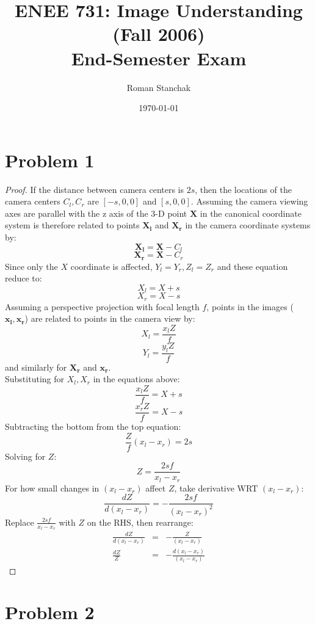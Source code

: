 \documentclass[letter,11pt]{article}
\title{ENEE 731: Image Understanding (Fall 2006)\\
End-Semester Exam}
\author{Roman Stanchak}
\date{\today}
\begin{document}
\maketitle

\section*{Problem 1}

	{\begin{proof} If the distance between camera centers is $2s$, then the locations of the camera centers $C_l,C_r$ are $[-s, 0, 0]$ and $[s, 0, 0]$.  Assuming the camera viewing axes are parallel with the z axis of the 3-D point $\mathbf{X}$ in the canonical coordinate system is therefore related to points $\mathbf{X_l}$ and $\mathbf{X_r}$ in the camera coordinate systems by:
$$\mathbf{X_l}=\mathbf{X}-C_l$$
$$\mathbf{X_r}=\mathbf{X}-C_r$$
Since only the $X$ coordinate is affected, $Y_l=Y_r, Z_l=Z_r$ and these equation reduce to:
$$X_l=X+s$$
$$X_r=X-s$$
Assuming a perspective projection with focal length $f$, points in the images ($\mathbf{x_l},\mathbf{x_r}$) are related to points in the camera view by:
$$X_l = \frac{x_l Z}{f}$$
$$Y_l = \frac{y_l Z}{f}$$
and similarly for $\mathbf{X_r}$ and $\mathbf{x_r}$.\\
Substituting for $X_l,X_r$ in the equations above:
$$\frac{x_l Z}{f} = X + s$$
$$\frac{x_r Z}{f} = X - s$$
Subtracting the bottom from the top equation:
$$\frac{Z}{f}(x_l-x_r) = 2s$$
Solving for $Z$:
$$Z = \frac{2sf}{x_l-x_r}$$
For how small changes in $(x_l-x_r)$ affect $Z$, take derivative WRT $(x_l-x_r)$:
\begin{equation*}
	\frac{dZ}{d(x_l-x_r)} = -\frac{2sf}{(x_l-x_r)^2}
\end{equation*}
Replace $\frac{2sf}{x_l-x_r}$ with $Z$ on the RHS, then rearrange:
\begin{eqnarray*}
	\frac{dZ}{d(x_l-x_r)} &=& -\frac{Z}{(x_l-x_r)}\\
	\frac{dZ}{Z} &=& -\frac{d(x_l-x_r)}{(x_l-x_r)}
\end{eqnarray*}
\end{proof}


\section*{Problem 2}

}
\end{document}
